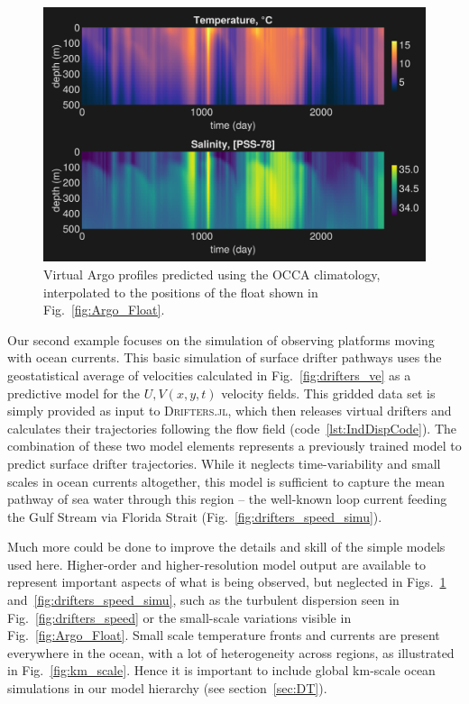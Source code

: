 \documentclass{juliacon}[12pt]
\newcommand{\pkg}[1]{{\small \textsc{#1}}}
\begin{document}
\begin{figure}[t]
\centerline{\includegraphics[width=\columnwidth]{figs/20240529_MITprof_OCCA.png}}
\caption{Virtual Argo profiles predicted using the OCCA climatology, interpolated to the positions of the float shown in Fig.~\ref{fig:Argo_Float}.}
\label{fig:Argo_Float_simu}
\end{figure}

Our second example focuses on the simulation of observing platforms moving with ocean currents. This basic simulation of surface drifter pathways uses the geostatistical average of velocities calculated in Fig.~\ref{fig:drifters_ve} as a predictive model for the $U,V(x,y,t)$ velocity fields. This gridded data set is simply provided as input to \pkg{Drifters.jl}, which then releases virtual drifters and calculates their trajectories following the flow field (code~\ref{lst:IndDispCode}). The combination of these two model elements represents a previously trained model to predict surface drifter trajectories. While it neglects time-variability and small scales in ocean currents altogether, this model is sufficient to capture the mean pathway of sea water through this region -- the well-known loop current feeding the Gulf Stream via Florida Strait (Fig.~\ref{fig:drifters_speed_simu}).

Much more could be done to improve the details and skill of the simple models used here. Higher-order and higher-resolution model output are available to represent important aspects of what is being observed, but neglected in Figs.~\ref{fig:Argo_Float_simu} and~\ref{fig:drifters_speed_simu}, such as the turbulent dispersion seen in Fig.~\ref{fig:drifters_speed} or the small-scale variations visible in Fig.~\ref{fig:Argo_Float}. Small scale temperature fronts and currents are present everywhere in the ocean, with a lot of heterogeneity across regions, as illustrated in Fig.~\ref{fig:km_scale}. Hence it is important to include global km-scale ocean simulations in our model hierarchy (see section~\ref{sec:DT}). 
\end{document}
